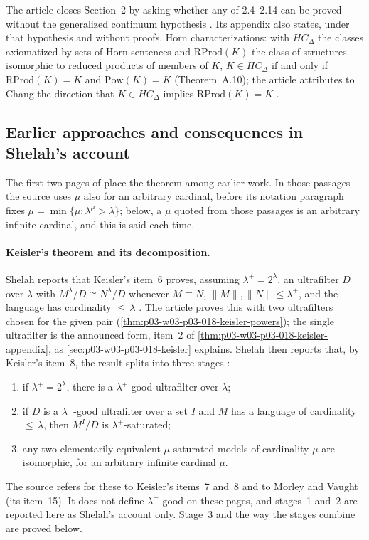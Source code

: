 The article closes Section~2 by asking whether any of 2.4--2.14 can be
proved without the generalized continuum hypothesis
\cite[p.~490]{Keisler1961ElementaryClasses}.  Its appendix also states,
under that hypothesis and without proofs, Horn characterizations: with
\(HC_\Delta\) the classes axiomatized by sets of Horn sentences and
\(\mathrm{RProd}(K)\) the class of structures isomorphic to reduced products
of members of \(K\), \(K\in HC_\Delta\) if and only if
\(\mathrm{RProd}(K)=K\) and \(\mathrm{Pow}(K)=K\) (Theorem~A.10); the
article attributes to Chang the direction that \(K\in HC_\Delta\) implies
\(\mathrm{RProd}(K)=K\) \cite[p.~493]{Keisler1961ElementaryClasses}.

\subsection{Earlier approaches and consequences in Shelah's account}
\label{sec:p03-w03-p03-017-shelah-context}

The first two pages of \textcite{Shelah1971Ultrapowers} place the theorem
among earlier work.  In those passages the source uses \(\mu\) also for an
arbitrary cardinal, before its notation paragraph fixes
\(\mu=\min\{\mu:\lambda^\mu>\lambda\}\); below, a \(\mu\) quoted from those
passages is an arbitrary infinite cardinal, and this is said each time.

\paragraph{Keisler's theorem and its decomposition.}  Shelah reports that
Keisler's item~6 proves, assuming \(\lambda^+=2^\lambda\), an ultrafilter
\(D\) over \(\lambda\) with \(M^\lambda/D\cong N^\lambda/D\) whenever
\(M\equiv N\), \(\lVert M\rVert,\lVert N\rVert\le\lambda^+\), and the
language has cardinality \({\le}\,\lambda\)
\cite[p.~224]{Shelah1971Ultrapowers}.  The article proves this with two
ultrafilters chosen for the given pair
(\cref{thm:p03-w03-p03-018-keisler-powers}); the single ultrafilter is the
announced form, item~2 of \cref{thm:p03-w03-p03-018-keisler-appendix}, as
\cref{sec:p03-w03-p03-018-keisler} explains.  Shelah then
reports that, by Keisler's item~8, the result splits into three stages
\cite[p.~224]{Shelah1971Ultrapowers}:
\begin{enumerate}
  \item if \(\lambda^+=2^\lambda\), there is a \(\lambda^+\)-good
        ultrafilter over \(\lambda\);
  \item if \(D\) is a \(\lambda^+\)-good ultrafilter over a set \(I\) and
        \(M\) has a language of cardinality \({\le}\,\lambda\), then
        \(M^I/D\) is \(\lambda^+\)-saturated;
  \item any two elementarily equivalent \(\mu\)-saturated models of
        cardinality \(\mu\) are isomorphic, for an arbitrary infinite
        cardinal \(\mu\).
\end{enumerate}
The source refers for these to Keisler's items~7 and~8 and to Morley and
Vaught (its item~15).  It does not define \(\lambda^+\)-good on these pages,
and stages~1 and~2 are reported here as Shelah's account only.  Stage~3 and
the way the stages combine are proved below.

